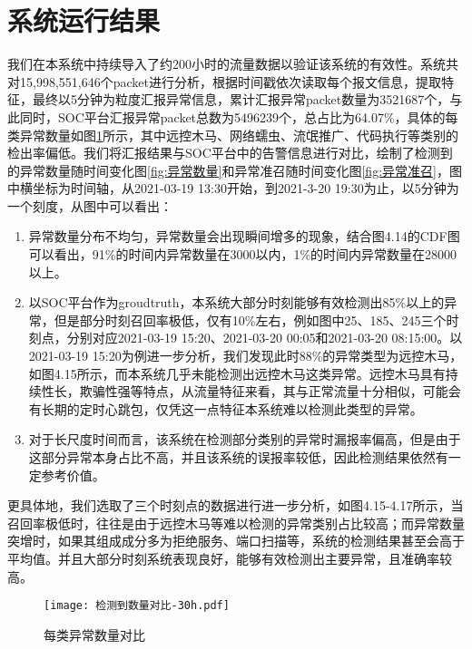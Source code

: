 \section{系统运行结果}
我们在本系统中持续导入了约200小时的流量数据以验证该系统的有效性。系统共对15,998,551,646个packet进行分析，根据时间戳依次读取每个报文信息，提取特征，最终以5分钟为粒度汇报异常信息，累计汇报异常packet数量为3521687个，与此同时，SOC平台汇报异常packet总数为5496239个，总占比为64.07\%，具体的每类异常数量如图\ref{fig:每类异常数量对比}所示，其中远控木马、网络蠕虫、流氓推广、代码执行等类别的检出率偏低。我们将汇报结果与SOC平台中的告警信息进行对比，绘制了检测到的异常数量随时间变化图\ref{fig:异常数量}和异常准召随时间变化图\ref{fig:异常准召}，图中横坐标为时间轴，从2021-03-19 13:30开始，到2021-3-20 19:30为止，以5分钟为一个刻度，从图中可以看出：
\begin{enumerate}
  \item 异常数量分布不均匀，异常数量会出现瞬间增多的现象，结合图4.14的CDF图可以看出，91\%的时间内异常数量在3000以内，1\%的时间内异常数量在28000以上。
  \item 以SOC平台作为groudtruth，本系统大部分时刻能够有效检测出85\%以上的异常，但是部分时刻召回率极低，仅有10\%左右，例如图中25、185、245三个时刻点，分别对应2021-03-19 15:20、2021-03-20 00:05和2021-03-20 08:15:00。以2021-03-19 15:20为例进一步分析，我们发现此时88\%的异常类型为远控木马，如图4.15所示，而本系统几乎未能检测出远控木马这类异常。远控木马具有持续性长，欺骗性强等特点，从流量特征来看，其与正常流量十分相似，可能会有长期的定时心跳包，仅凭这一点特征本系统难以检测此类型的异常。
  \item 对于长尺度时间而言，该系统在检测部分类别的异常时漏报率偏高，但是由于这部分异常本身占比不高，并且该系统的误报率较低，因此检测结果依然有一定参考价值。
\end{enumerate}

更具体地，我们选取了三个时刻点的数据进行进一步分析，如图4.15-4.17所示，当召回率极低时，往往是由于远控木马等难以检测的异常类别占比较高；而异常数量突增时，如果其组成成分多为拒绝服务、端口扫描等，系统的检测结果甚至会高于平均值。并且大部分时刻系统表现良好，能够有效检测出主要异常，且准确率较高。


\begin{figure}
  \centering
  \texttt{[image: 检测到数量对比-30h.pdf]}
  \caption{每类异常数量对比}
  \label{fig:每类异常数量对比}
\end{figure}


